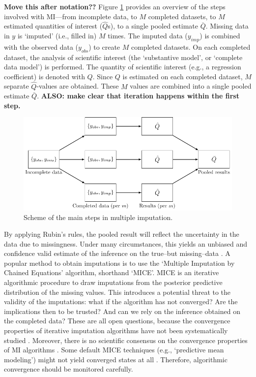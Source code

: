 \documentclass[Royal,times,sageh]{sagej}
\begin{document}
\textbf{Move this after notation??} Figure \ref{fig:diagram} provides an
overview of the steps involved with MI---from incomplete data, to \(M\)
completed datasets, to \(M\) estimated quantities of interest
(\(\hat{Q}\)s), to a single pooled estimate \(\bar{Q}\). Missing data in
\(y\) is `imputed' (i.e., filled in) \(M\) times. The imputed data
(\(y_{imp}\)) is combined with the observed data (\(y_{obs}\)) to create
\(M\) completed datasets. On each completed dataset, the analysis of
scientific interest (the `substantive model', or `complete data model')
is performed. The quantity of scientific interest (e.g., a regression
coefficient) is denoted with \(Q\). Since \(Q\) is estimated on each
completed dataset, \(M\) separate \(\hat{Q}\)-values are obtained. These
\(M\) values are combined into a single pooled estimate \(\bar{Q}\).
\textbf{ALSO: make clear that iteration happens within the first step.}

\begin{figure}

{\centering \includegraphics[width=\linewidth]{./images/diagram} 

}

\caption{Scheme of the main steps in multiple imputation.}\label{fig:diagram}
\end{figure}

By applying Rubin's rules, the pooled result will reflect the
uncertainty in the data due to missingness. Under many circumstances,
this yields an unbiased and confidence valid estimate of the inference
on the true--but missing--data \citep{buur18}. A popular method to
obtain imputations is to use the `Multiple Imputation by Chained
Equations' algorithm, shorthand `MICE'\citep{mice}. MICE is an iterative
algorithmic procedure to draw imputations from the posterior predictive
distribution of the missing values. This introduces a potential threat
to the validity of the imputations: what if the algorithm has not
converged? Are the implications then to be trusted? And can we rely on
the inference obtained on the completed data? These are all open
questions, because the convergence properties of iterative imputation
algorithms have not been systematically studied \citep{buur18}.
Moreover, there is no scientific consensus on the convergence properties
of MI algorithms \citep{taka17}. Some default MICE techniques (e.g.,
`predictive mean modeling') might not yield converged states at all
\citep{murr18}. Therefore, algorithmic convergence should be monitored
carefully.
\end{document}
